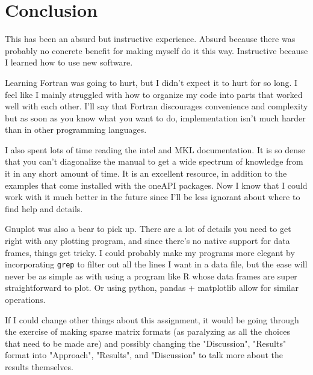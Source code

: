 \documentclass{article}
\begin{document}
\newpage

{\centering



}



\newpage

\section{
Conclusion
}

This has been an absurd but instructive experience.
Absurd because there was probably no concrete benefit
for making myself do it this way.
Instructive because I learned how to use new software.

Learning Fortran was going to hurt, but I didn't expect
it to hurt for so long.
I feel like I mainly struggled with how to organize my
code into parts that worked well with each other.
I'll say that Fortran discourages convenience and complexity
but as soon as you know what you want to do, implementation
isn't much harder than in other programming languages.

I also spent lots of time reading the intel and MKL documentation.
It is so dense that you can't diagonalize the manual to get
a wide spectrum of knowledge from it in any short amount of time.
It is an excellent resource, in addition to the examples that come
installed with the oneAPI packages.
Now I know that I could work with it much better in the future
since I'll be less ignorant about where to find help and details.

Gnuplot was also a bear to pick up.
There are a lot of details you need to get right with any plotting program,
and since there's no native support for data frames, things get tricky.
I could probably make my programs more elegant by incorporating {\tt grep}
to filter out all the lines I want in a data file, but the ease will never
be as simple as with using a program like R whose data frames are super
straightforward to plot.
Or using python, pandas + matplotlib allow for similar operations.

If I could change other things about this assignment, it would be
going through the exercise of making sparse matrix formats 
(as paralyzing as all the choices that need to be made are)
and possibly changing the "Discussion", "Results" format into
"Approach", "Results", and "Discussion" to talk more about 
the results themselves.

\newpage
\end{document}
